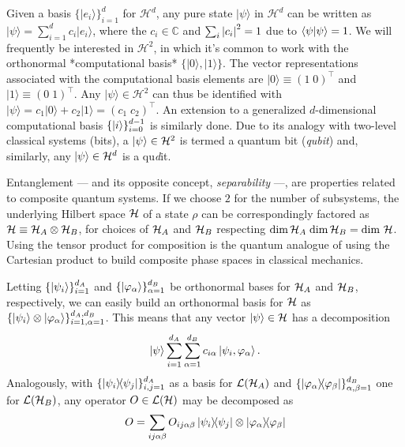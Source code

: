 		Given a basis $\{ \lvert e_i \rangle \}_{i=1}^d$ for $\mathcal{H}^d$, any pure state $\lvert \psi \rangle$ in $\mathcal{H}^d$ can be written as $\lvert \psi \rangle = \sum_{i=1}^d c_i \lvert e_i \rangle$, where the $c_i \in \mathbb{C}$ and $\sum_i \abs{c_i}^2 = 1$ due to $\braket{\psi}{\psi} = 1$. We will frequently be interested in $\mathcal{H}^2$, in which it's common to work with the orthonormal *computational basis* $\{ \lvert 0 \rangle, \lvert 1 \rangle \}$. The vector representations associated with the computational basis elements are $\lvert 0 \rangle \equiv \left( 1 \; 0 \right)^\intercal$ and $\lvert 1 \rangle \equiv \left( 0 \; 1 \right)^\intercal$. Any $\lvert \psi \rangle \in \mathcal{H}^2$ can thus be identified with $\lvert \psi \rangle = c_1 \lvert 0 \rangle + c_2 \lvert 1 \rangle = \left( c_1 \; c_2 \right)^\intercal$. An extension to a generalized $d$-dimensional computational basis $\{ \ket{i} \}_{i=0}^{d-1}$ is similarly done. Due to its analogy with two-level classical systems (bits), a $\ket{\psi} \in \mathcal{H}^{2}$ is termed a quantum bit (\emph{qubit}) and, similarly, any $\ket{\psi} \in \mathcal{H}^{d}$ is a qu\emph{d}it.
	
	
		Entanglement --- and its opposite concept, \emph{separability} ---, are properties related to composite quantum systems. If we choose $2$ for the number of subsystems, the underlying Hilbert space $\mathcal{H}$ of a state $\rho$ can be correspondingly factored as $\mathcal{H} \equiv \mathcal{H}_A \otimes \mathcal{H}_B$, for choices of  $\mathcal{H}_A$ and $\mathcal{H}_B$ respecting $\text{dim} \,\mathcal{H}_A \; \text{dim} \,\mathcal{H}_B = \text{dim } \mathcal{H}$. Using the tensor product for composition is the quantum analogue of using the Cartesian product to build composite phase spaces in classical mechanics.
	
		Letting $\{ \ket{ \psi_i } \}_{i=1}^{d_A}$ and $\{ \ket{ \varphi_\alpha } \}_{\alpha=1}^{d_B}$ be orthonormal bases for $\mathcal{H}_A$ and $\mathcal{H}_B$, respectively, we can easily build an orthonormal basis for $\mathcal{H}$ as $\{ \ket{\psi_i} \otimes \ket{\varphi_\alpha} \}_{i=1, \alpha = 1}^{d_A, d_B}$. This means that any vector $\ket{\psi} \in \mathcal{H}$ has a decomposition
		$$
			\ket{\psi} \sum_{i=1}^{d_A}\sum_{\alpha=1}^{d_B} c_{i\alpha} \ket{\psi_i, \varphi_\alpha} .
			\label{eq:pure-state-decomposition}
		$$
		Analogously, with $\{ \ketbra{\psi_i}{\psi_j} \}_{i,j=1}^{d_A}$ as a basis for $\mathcal{L}(\mathcal{H}_A)$ and $\{ \ketbra{\varphi_\alpha}{\varphi_\beta} \}_{\alpha,\beta=1}^{d_B}$ one for $\mathcal{L}(\mathcal{H}_B)$, any operator $O \in \mathcal{L}(\mathcal{H})$ may be decomposed as
		$$
			O = \sum_{ij\alpha\beta} O_{ij\alpha\beta} \ketbra{\psi_i}{\psi_j} \otimes \ketbra{\varphi_\alpha}{\varphi_\beta}
			\label{eq:decomposed-operator}
		$$
	
